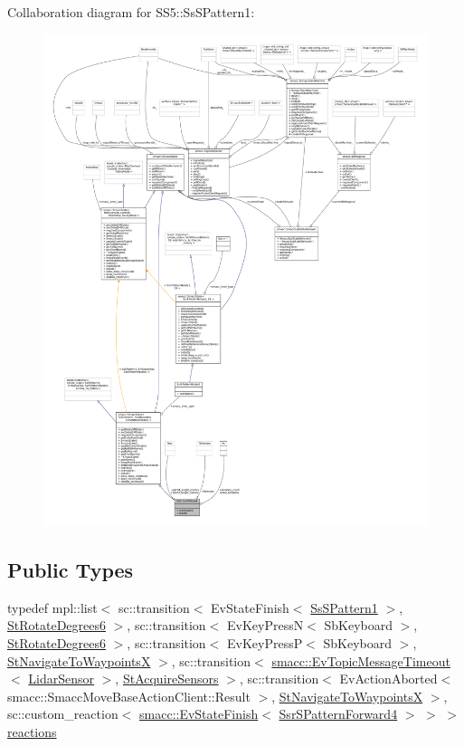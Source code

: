 Collaboration diagram for S\+S5\+:\+:Ss\+S\+Pattern1\+:
\nopagebreak
\begin{figure}[H]
\begin{center}
\leavevmode
\includegraphics[width=350pt]{structSS5_1_1SsSPattern1__coll__graph}
\end{center}
\end{figure}
\subsection*{Public Types}
\begin{DoxyCompactItemize}
\item 
typedef mpl\+::list$<$ sc\+::transition$<$ Ev\+State\+Finish$<$ \hyperlink{structSS5_1_1SsSPattern1}{Ss\+S\+Pattern1} $>$, \hyperlink{structStRotateDegrees6}{St\+Rotate\+Degrees6} $>$, sc\+::transition$<$ Ev\+Key\+PressN$<$ Sb\+Keyboard $>$, \hyperlink{structStRotateDegrees6}{St\+Rotate\+Degrees6} $>$, sc\+::transition$<$ Ev\+Key\+PressP$<$ Sb\+Keyboard $>$, \hyperlink{structStNavigateToWaypointsX}{St\+Navigate\+To\+WaypointsX} $>$, sc\+::transition$<$ \hyperlink{structsmacc_1_1EvTopicMessageTimeout}{smacc\+::\+Ev\+Topic\+Message\+Timeout}$<$ \hyperlink{sensor__state_8h_a9db9e1944f88de79507758d08e4a2ee3}{Lidar\+Sensor} $>$, \hyperlink{structStAcquireSensors}{St\+Acquire\+Sensors} $>$, sc\+::transition$<$ Ev\+Action\+Aborted$<$ smacc\+::\+Smacc\+Move\+Base\+Action\+Client\+::\+Result $>$, \hyperlink{structStNavigateToWaypointsX}{St\+Navigate\+To\+WaypointsX} $>$, sc\+::custom\+\_\+reaction$<$ \hyperlink{structsmacc_1_1EvStateFinish}{smacc\+::\+Ev\+State\+Finish}$<$ \hyperlink{structSsrSPatternForward4}{Ssr\+S\+Pattern\+Forward4} $>$ $>$ $>$ \hyperlink{structSS5_1_1SsSPattern1_a8648e4550f7797bdce01235f05b24d0a}{reactions}
\end{DoxyCompactItemize}
